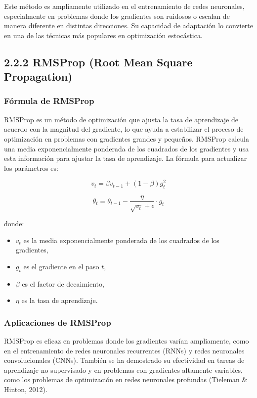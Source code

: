 \documentclass[a5paper]{article}
\begin{document}
	Este método es ampliamente utilizado en el entrenamiento de redes neuronales, especialmente en problemas donde los gradientes son ruidosos o escalan de manera diferente en distintas direcciones. Su capacidad de adaptación lo convierte en una de las técnicas más populares en optimización estocástica.
	
	\subsection*{2.2.2 RMSProp (Root Mean Square Propagation)}
	
	\subsubsection*{Fórmula de RMSProp}
	
	RMSProp es un método de optimización que ajusta la tasa de aprendizaje de acuerdo con la magnitud del gradiente, lo que ayuda a estabilizar el proceso de optimización en problemas con gradientes grandes y pequeños. RMSProp calcula una media exponencialmente ponderada de los cuadrados de los gradientes y usa esta información para ajustar la tasa de aprendizaje. La fórmula para actualizar los parámetros es:
	
	\[
	v_t = \beta v_{t-1} + (1 - \beta) g_t^2
	\]
	
	\[
	\theta_t = \theta_{t-1} - \frac{\eta}{\sqrt{v_t} + \epsilon} \cdot g_t
	\]
	
	donde:
	\begin{itemize}
		\item \( v_t \) es la media exponencialmente ponderada de los cuadrados de los gradientes,
		\item \( g_t \) es el gradiente en el paso \( t \),
		\item \( \beta \) es el factor de decaimiento,
		\item \( \eta \) es la tasa de aprendizaje.
	\end{itemize}
	
	\subsubsection*{Aplicaciones de RMSProp}
	
	RMSProp es eficaz en problemas donde los gradientes varían ampliamente, como en el entrenamiento de redes neuronales recurrentes (RNNs) y redes neuronales convolucionales (CNNs). También se ha demostrado su efectividad en tareas de aprendizaje no supervisado y en problemas con gradientes altamente variables, como los problemas de optimización en redes neuronales profundas (Tieleman \& Hinton, 2012).
	
\end{document}
